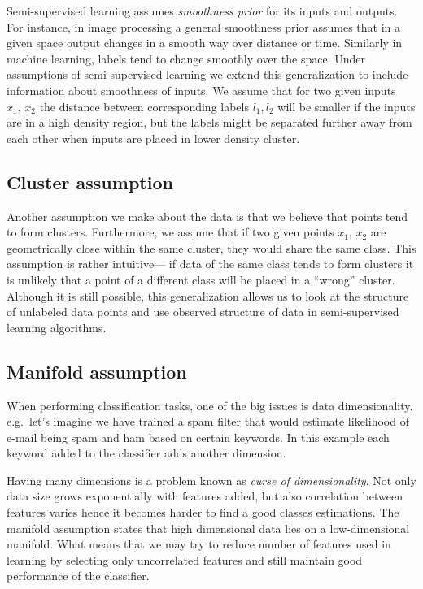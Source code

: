 \documentclass[12pt, a4paper, pdflatex]{report}
\begin{document}
Semi-supervised learning assumes \emph{smoothness prior} for its inputs and outputs\cite{chapelle06}. For instance, in image processing a general smoothness prior assumes that in a given space output changes in a smooth way over distance or time\cite{stan95}. Similarly in machine learning, labels tend to change smoothly over the space. Under assumptions of semi-supervised learning we extend this generalization to include information about smoothness of inputs. We assume that for two given inputs $ x_1\text{, }x_2 $ the distance between corresponding labels $ l_1, l_2 $ will be smaller if the inputs are in a high density region, but the labels might be separated further away from each other when inputs are placed in lower density cluster.

\subsection{Cluster assumption}
\label{sec:clusterassump}

Another assumption we make about the data is that we believe that points tend to form clusters. Furthermore, we assume that if two given points $ x_1\text{, }x_2 $ are geometrically close within the same cluster, they would share the same class\cite{chapelle06}.
This assumption is rather intuitive---  if data of the same class tends to form clusters it is unlikely that a point of a different class will be placed in a ``wrong'' cluster. Although it is still possible, this generalization allows us to look at the structure of unlabeled data points and use observed structure of data in semi-supervised learning algorithms.

\subsection{Manifold assumption}
 
When performing classification tasks, one of the big issues is data dimensionality. e.g.\ let's imagine we have trained a spam filter that would estimate likelihood of e-mail being spam and ham based on certain keywords. In this example each keyword added to the classifier adds another dimension. 

Having many dimensions is a problem known as \textit{curse of dimensionality}\cite{chapelle06}. Not only data size grows exponentially with features added, but also correlation between features varies hence it becomes harder to find a good classes estimations. The manifold assumption states that high dimensional data lies on a low-dimensional manifold. What means that we may try to reduce number of features used in learning by selecting only uncorrelated features and still maintain good performance of the classifier. 
\end{document}

